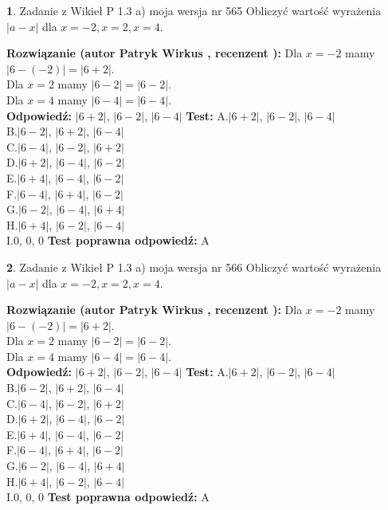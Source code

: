 \documentclass[12pt, a4paper]{article}
\theoremstyle{definition} %
\newtheorem{zad}{}
\newcommand{\zadStart}[1]{\begin{zad}#1\newline}
\newcommand{\zadStop}{\end{zad}}
\newcommand{\rozwStart}[2]{\noindent \textbf{Rozwiązanie (autor #1 , recenzent #2): }\newline}
\newcommand{\rozwStop}{\newline}
\newcommand{\odpStart}{\noindent \textbf{Odpowiedź:}\newline}
\newcommand{\odpStop}{\newline}
\newcommand{\testStart}{\noindent \textbf{Test:}\newline}
\newcommand{\testStop}{\newline}
\newcommand{\kluczStart}{\noindent \textbf{Test poprawna odpowiedź:}\newline}
\newcommand{\kluczStop}{\newline}
\begin{document}
\zadStart{Zadanie z Wikieł P 1.3 a) moja wersja nr 565}
Obliczyć wartość wyrażenia $|a - x|$ dla $x=-2,x=2,x=4$.
\zadStop
\rozwStart{Patryk Wirkus}{}
Dla $x = -2$ mamy $|6 - (-2)| = |6 + 2|$.\\
Dla $x = 2$ mamy $|6 - 2| = |6 - 2|$.\\
Dla $x = 4$ mamy $|6 - 4| = |6 - 4|$.\\
\rozwStop
\odpStart
$|6 + 2|$, $|6 - 2|$, $|6 - 4|$
\odpStop
\testStart
A.$|6 + 2|$, $|6 - 2|$, $|6 - 4|$\\
B.$|6 - 2|$, $|6 + 2|$, $|6 - 4|$\\
C.$|6 - 4|$, $|6 - 2|$, $|6 + 2|$\\
D.$|6 + 2|$, $|6 - 4|$, $|6 - 2|$\\
E.$|6 + 4|$, $|6 - 4|$, $|6 - 2|$\\
F.$|6 - 4|$, $|6 + 4|$, $|6 - 2|$\\
G.$|6 - 2|$, $|6 - 4|$, $|6 + 4|$\\
H.$|6 + 4|$, $|6 - 2|$, $|6 - 4|$\\
I.$0$, $0$, $0$
\testStop
\kluczStart
A
\kluczStop



\zadStart{Zadanie z Wikieł P 1.3 a) moja wersja nr 566}
Obliczyć wartość wyrażenia $|a - x|$ dla $x=-2,x=2,x=4$.
\zadStop
\rozwStart{Patryk Wirkus}{}
Dla $x = -2$ mamy $|6 - (-2)| = |6 + 2|$.\\
Dla $x = 2$ mamy $|6 - 2| = |6 - 2|$.\\
Dla $x = 4$ mamy $|6 - 4| = |6 - 4|$.\\
\rozwStop
\odpStart
$|6 + 2|$, $|6 - 2|$, $|6 - 4|$
\odpStop
\testStart
A.$|6 + 2|$, $|6 - 2|$, $|6 - 4|$\\
B.$|6 - 2|$, $|6 + 2|$, $|6 - 4|$\\
C.$|6 - 4|$, $|6 - 2|$, $|6 + 2|$\\
D.$|6 + 2|$, $|6 - 4|$, $|6 - 2|$\\
E.$|6 + 4|$, $|6 - 4|$, $|6 - 2|$\\
F.$|6 - 4|$, $|6 + 4|$, $|6 - 2|$\\
G.$|6 - 2|$, $|6 - 4|$, $|6 + 4|$\\
H.$|6 + 4|$, $|6 - 2|$, $|6 - 4|$\\
I.$0$, $0$, $0$
\testStop
\kluczStart
A
\kluczStop
\end{document}
